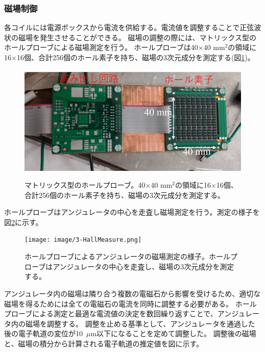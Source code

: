 \documentclass[a4paper,11pt,uplatex]{jsbook}
\begin{document}
\subsubsection{磁場制御}
各コイルには電源ボックスから電流を供給する。電流値を調整することで正弦波状の磁場を発生させることができる。
磁場の調整の際には、マトリックス型のホールプローブによる磁場測定を行う。
ホールプローブは40$\times$40 mm$^2$の領域に16$\times$16個、合計256個のホール素子を持ち、磁場の3次元成分を測定する(図\ref{hall})。
\begin{figure}
  \centering
  \includegraphics[width=0.7\linewidth]{image/3-hallmatrix.png}\\
  \caption[ホールプローブ]{マトリックス型のホールプローブ。40$\times$40 mm$^2$の領域に16$\times$16個、合計256個のホール素子を持ち、磁場の3次元成分を測定する。}
  \label{hall}
\end{figure}
ホールプローブはアンジュレータの中心を走査し磁場測定を行う。測定の様子を図\ref{hallscan}に示す。
\begin{figure}
  \centering
  \texttt{[image: image/3-HallMeasure.png]}\\
  \caption[ホールプローブの走査]{ホールプローブによるアンジュレータの磁場測定の様子。ホールプローブはアンジュレータの中心を走査し、磁場の3次元成分を測定する。}
  \label{hallscan}
\end{figure}
アンジュレータ内の磁場は隣り合う複数の電磁石から影響を受けるため、適切な磁場を得るためには全ての電磁石の電流を同時に調整する必要がある。
ホールプローブによる測定と最適な電流値の決定を数回繰り返すことで、アンジュレータ内の磁場を調整する。
調整を止める基準として、アンジュレータを通過した後の電子軌道の変位が10~$\mu$m以下になることを定めて調整した。
調整後の磁場と、磁場の積分から計算される電子軌道の推定値を図に示す。
\end{document}
